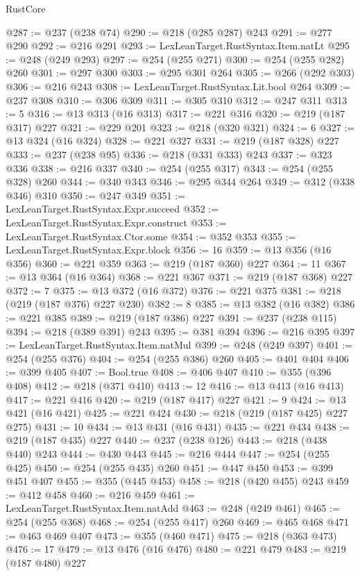 \begin{lexlean}{RustCore}
\begin{coremodule}
@287 := @237 (@238 @74)
@290 := @218 (@285 @287) @243
@291 := @277 @290
@292 := @216 @291
@293 := LexLeanTarget.RustSyntax.Item.natLt
@295 := @248 (@249 @293)
@297 := @254 (@255 @271)
@300 := @254 (@255 @282) @260
@301 := @297 @300
@303 := @295 @301 @264
@305 := @266 (@292 @303)
@306 := @216 @243
@308 := LexLeanTarget.RustSyntax.Lit.bool @264
@309 := @237 @308
@310 := @306 @309
@311 := @305 @310
@312 := @247 @311
@313 := 5
@316 := @13 @313 (@16 @313)
@317 := @221 @316
@320 := @219 (@187 @317) @227
@321 := @229 @201
@323 := @218 (@320 @321)
@324 := 6
@327 := @13 @324 (@16 @324)
@328 := @221 @327
@331 := @219 (@187 @328) @227
@333 := @237 (@238 @95)
@336 := @218 (@331 @333) @243
@337 := @323 @336
@338 := @216 @337
@340 := @254 (@255 @317)
@343 := @254 (@255 @328) @260
@344 := @340 @343
@346 := @295 @344 @264
@349 := @312 (@338 @346) @310
@350 := @247 @349
@351 := LexLeanTarget.RustSyntax.Expr.succeed
@352 := LexLeanTarget.RustSyntax.Expr.construct
@353 := LexLeanTarget.RustSyntax.Ctor.some
@354 := @352 @353
@355 := LexLeanTarget.RustSyntax.Expr.block
@356 := 16
@359 := @13 @356 (@16 @356)
@360 := @221 @359
@363 := @219 (@187 @360) @227
@364 := 11
@367 := @13 @364 (@16 @364)
@368 := @221 @367
@371 := @219 (@187 @368) @227
@372 := 7
@375 := @13 @372 (@16 @372)
@376 := @221 @375
@381 := @218 (@219 (@187 @376) @227 @230)
@382 := 8
@385 := @13 @382 (@16 @382)
@386 := @221 @385
@389 := @219 (@187 @386) @227
@391 := @237 (@238 @115)
@394 := @218 (@389 @391) @243
@395 := @381 @394
@396 := @216 @395
@397 := LexLeanTarget.RustSyntax.Item.natMul
@399 := @248 (@249 @397)
@401 := @254 (@255 @376)
@404 := @254 (@255 @386) @260
@405 := @401 @404
@406 := @399 @405
@407 := Bool.true
@408 := @406 @407
@410 := @355 (@396 @408)
@412 := @218 (@371 @410)
@413 := 12
@416 := @13 @413 (@16 @413)
@417 := @221 @416
@420 := @219 (@187 @417) @227
@421 := 9
@424 := @13 @421 (@16 @421)
@425 := @221 @424
@430 := @218 (@219 (@187 @425) @227 @275)
@431 := 10
@434 := @13 @431 (@16 @431)
@435 := @221 @434
@438 := @219 (@187 @435) @227
@440 := @237 (@238 @126)
@443 := @218 (@438 @440) @243
@444 := @430 @443
@445 := @216 @444
@447 := @254 (@255 @425)
@450 := @254 (@255 @435) @260
@451 := @447 @450
@453 := @399 @451 @407
@455 := @355 (@445 @453)
@458 := @218 (@420 @455) @243
@459 := @412 @458
@460 := @216 @459
@461 := LexLeanTarget.RustSyntax.Item.natAdd
@463 := @248 (@249 @461)
@465 := @254 (@255 @368)
@468 := @254 (@255 @417) @260
@469 := @465 @468
@471 := @463 @469 @407
@473 := @355 (@460 @471)
@475 := @218 (@363 @473)
@476 := 17
@479 := @13 @476 (@16 @476)
@480 := @221 @479
@483 := @219 (@187 @480) @227

\end{coremodule}
\end{lexlean}
